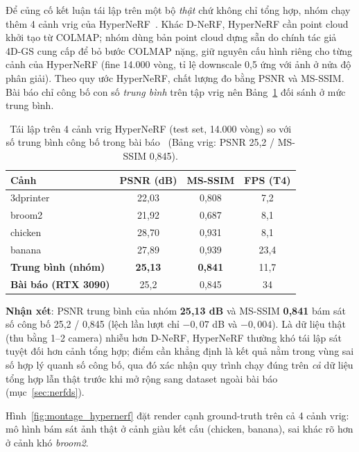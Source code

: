 \documentclass[a4paper]{report}
\begin{document}
Để củng cố kết luận tái lập trên một bộ \textit{thật} chứ không chỉ tổng hợp, nhóm
chạy thêm 4 cảnh vrig của HyperNeRF~\cite{park2021hypernerf}. Khác D-NeRF, HyperNeRF
cần point cloud khởi tạo từ COLMAP; nhóm dùng bản point cloud dựng sẵn do chính tác
giả 4D-GS cung cấp để bỏ bước COLMAP nặng, giữ nguyên cấu hình
riêng cho từng cảnh của HyperNeRF (fine 14.000 vòng, tỉ lệ downscale 0,5 ứng với
ảnh ở nửa độ phân giải). Theo quy ước HyperNeRF, chất lượng đo bằng PSNR và MS-SSIM. Bài
báo chỉ công bố con số \textit{trung bình} trên tập vrig nên Bảng~\ref{tab:hypernerf}
đối sánh ở mức trung bình.

\begin{table}[H]
\centering
\small
\caption[Kết quả tái lập trên HyperNeRF]{Tái lập trên 4 cảnh vrig HyperNeRF (test set, 14.000 vòng) so với số
trung bình công bố trong bài báo~\cite{wu20244dgs} (Bảng vrig: PSNR 25,2 / MS-SSIM 0,845).}
\label{tab:hypernerf}
\setlength{\tabcolsep}{6pt}
\begin{tabular}{l|cc|c}
\hline
\textbf{Cảnh} & \textbf{PSNR (dB)} & \textbf{MS-SSIM} & \textbf{FPS (T4)} \\
\hline
3dprinter & 22,03 & 0,808 & 7,2 \\
broom2    & 21,92 & 0,687 & 8,1 \\
chicken   & 28,70 & 0,931 & 8,1 \\
banana    & 27,89 & 0,939 & 23,4 \\
\hline
\textbf{Trung bình (nhóm)} & \textbf{25,13} & \textbf{0,841} & 11,7 \\
\textbf{Bài báo (RTX 3090)} & 25,2 & 0,845 & 34 \\
\hline
\end{tabular}
\end{table}

\textbf{Nhận xét}: PSNR trung bình của nhóm \textbf{25,13 dB} và MS-SSIM \textbf{0,841}
bám sát số công bố 25,2 / 0,845 (lệch lần lượt chỉ $-0{,}07$ dB và $-0{,}004$).
Là dữ liệu thật (thu bằng 1--2 camera) nhiễu hơn D-NeRF, HyperNeRF thường khó tái lập sát tuyệt
đối hơn cảnh tổng hợp; điểm cần khẳng định là kết quả nằm trong vùng sai số hợp lý
quanh số công bố, qua đó xác nhận quy trình chạy đúng trên \textit{cả} dữ liệu tổng
hợp lẫn thật trước khi mở rộng sang dataset ngoài bài báo (mục~\ref{sec:nerfds}).

Hình~\ref{fig:montage_hypernerf} đặt render cạnh ground-truth trên cả 4 cảnh vrig:
mô hình bám sát ảnh thật ở cảnh giàu kết cấu (chicken, banana), sai khác rõ hơn ở
cảnh khó \textit{broom2}.
\end{document}
